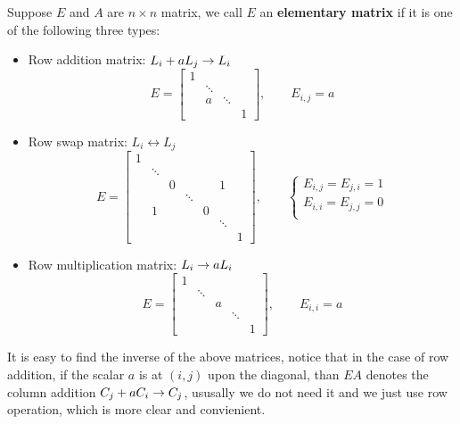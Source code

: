 \documentclass[en,hazy,black,pc,12pt]{elegantnote}
\begin{document}
\begin{remark}
    Suppose \(E\) and \(A\) are \(n \times n\) matrix, we call \(E\) an {\bf{elementary matrix}} if it is one of the following three types:
\begin{itemize}
    \item Row addition matrix: \(L_i+aL_j \rightarrow L_i\)
\[E = \begin{bmatrix}
    1 \\
    & \ddots\\
    & a & \ddots\\
    & & & 1 
    \end{bmatrix}, \qquad E_{i,j}=a\]
    \item Row swap matrix: \(L_i \leftrightarrow L_j\)
    \[E= \begin{bmatrix}
        1\\
        & \ddots\\
        & & 0 & & & 1\\
        & & & \ddots\\
        & 1 & & & 0 \\
        & & & & & \ddots\\ 
        & & & & & & 1
    \end{bmatrix}, \qquad 
    \begin{cases}
        E_{i,j}=E_{j,i}=1 \\
        E_{i,i}=E_{j,j}=0 \\
    \end{cases}\]
    \item Row multiplication matrix: \(L_i \rightarrow aL_i\)
    \[E = \begin{bmatrix}
        1\\
        & \ddots\\
        & & a \\
        & & & \ddots \\
        & & & & 1
    \end{bmatrix}, \qquad E_{i,i} = a\]

\end{itemize}

\end{remark}

It is easy to find the inverse of the above matrices, notice that in the case of row addition, if the scalar \(a\) is at \((i,j)\) upon the diagonal, than \(EA\) denotes the column addition \(C_j + aC_i \rightarrow C_j\), ususally we do not need it and we just use row operation, which is more clear and convienient.
\end{document}
